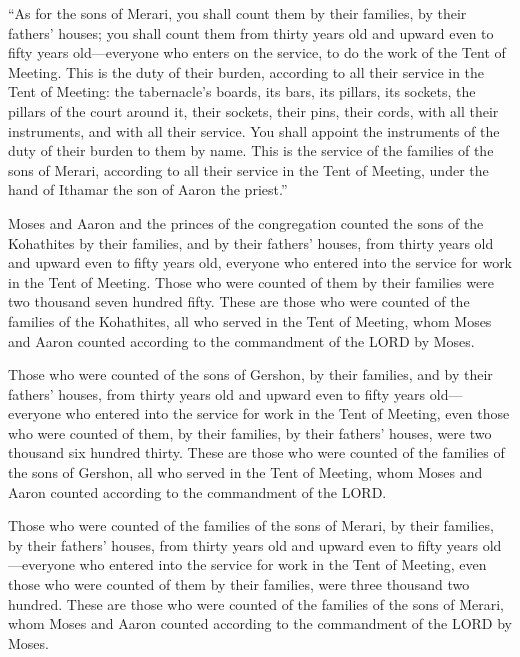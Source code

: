 \myverse{}“As for the sons of Merari, you shall count them by their families,
by their fathers’ houses;
\myverse{}you shall count them from thirty years old and upward even to fifty years
old—everyone who enters on the service, to do the work of the Tent of Meeting.
\myverse{}This is the duty of their burden, according to all their service in the Tent
of Meeting: the tabernacle’s boards, its bars, its pillars, its sockets,
\myverse{}the pillars of the court around it, their sockets, their pins, their cords,
with all their instruments, and with all their service. You shall appoint the instruments of the duty
of their burden to them by name.
\myverse{}This is the service of the families of the sons of Merari, according to all
their service in the Tent of Meeting, under the hand of Ithamar the son of Aaron the priest.”


\myverse{}Moses and Aaron and the princes of the congregation counted the
sons of the Kohathites by their families, and by their fathers’ houses,
\myverse{}from thirty years old and upward even to fifty years old, everyone who entered
into the service for work in the Tent of Meeting.
\myverse{}Those who were counted of them by their families were two thousand seven hundred
fifty.
\myverse{}These are those who were counted of the families of the Kohathites, all who
served in the Tent of Meeting, whom Moses and Aaron counted according to the commandment of the LORD by
Moses.


\myverse{}Those who were counted of the sons of Gershon, by their families,
and by their fathers’ houses,
\myverse{}from thirty years old and upward even to fifty years old—everyone who entered
into the service for work in the Tent of Meeting,
\myverse{}even those who were counted of them, by their families, by their fathers’
houses, were two thousand six hundred thirty.
\myverse{}These are those who were counted of the families of the sons of Gershon, all
who served in the Tent of Meeting, whom Moses and Aaron counted according to the commandment of the LORD.


\myverse{}Those who were counted of the families of the sons of Merari,
by their families, by their fathers’ houses,
\myverse{}from thirty years old and upward even to fifty years old—everyone who entered
into the service for work in the Tent of Meeting,
\myverse{}even those who were counted of them by their families, were three thousand
two hundred.
\myverse{}These are those who were counted of the families of the sons of Merari, whom
Moses and Aaron counted according to the commandment of the LORD by Moses.


